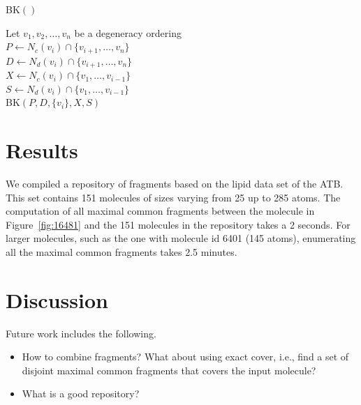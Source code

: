 \documentclass[11pt]{article}
\begin{document}
\begin{algorithm2e}
  \caption{\textsc{BK}$()$}
  \label{alg:bk-degeneracy}
  Let $v_1, v_2, \ldots, v_n$ be a degeneracy ordering\\
  {
    $P \leftarrow N_c(v_i) \cap \{v_{i+1}, \ldots, v_n\}$\\
    $D \leftarrow N_d(v_i) \cap \{v_{i+1}, \ldots, v_n\}$\\
    $X \leftarrow N_c(v_i) \cap \{v_1, \ldots, v_{i-1}\}$\\
    $S \leftarrow N_d(v_i) \cap \{v_1, \ldots, v_{i-1}\}$\\
    \textsc{BK}$(P, D, \{v_i\}, X, S)$
  }
\end{algorithm2e}

\section{Results}

We compiled a repository of fragments based on the lipid data set of the ATB. 
This set contains 151 molecules of sizes varying from 25 up to 285 atoms. 
The computation of all maximal common fragments between the molecule in 
Figure~\ref{fig:16481} and the 151 molecules in the repository takes a 2 seconds. 
For larger molecules, such as the one with molecule id 6401 (145 atoms), 
enumerating all the maximal common fragments takes 2.5 minutes.

\section{Discussion}

Future work includes the following.
\begin{itemize}
  \item How to combine fragments? What about using exact cover, i.e., find a set
    of disjoint maximal common fragments that covers the input molecule?
  \item What is a good repository?
\end{itemize}



\end{document}
